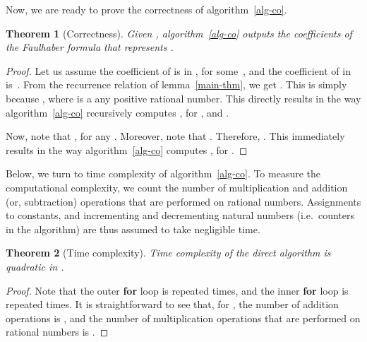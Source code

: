 \documentclass[a4paper,10pt]{amsart}
\newtheorem{theorem}{Theorem}
\theoremstyle{remark}
\begin{document}
Now, we are ready to prove the correctness of algorithm~\ref{alg-co}.
\begin{theorem}[Correctness]
Given , algorithm~\ref{alg-co} outputs the
coefficients of the Faulhaber formula that represents .
\end{theorem}
\begin{proof}
Let us assume the coefficient of  is  in , for
some~, and the coefficient of  in 
is~. From the recurrence relation of lemma~\ref{main-thm}, we
get . This is simply because , where  is a any positive rational
number. This directly results in the way  algorithm~\ref{alg-co}
recursively computes , for , and .

Now, note that , for any . Moreover, note that
. Therefore,
. This immediately results in the way
algorithm~\ref{alg-co} computes , for .
\end{proof}

Below, we turn to time complexity of algorithm~\ref{alg-co}.  To
measure the computational complexity, we count the number of
multiplication and addition (or, subtraction) operations that are
performed on rational numbers.  Assignments to constants, and
incrementing and decrementing natural numbers (i.e.\ counters in the
algorithm) are thus assumed to take negligible time.

\begin{theorem}[Time complexity]
Time complexity of the direct algorithm is quadratic in .
\end{theorem}
\begin{proof}
Note that the outer \textbf{for} loop is repeated  times, and the
inner \textbf{for} loop is repeated 
times. It is straightforward to see that, for , the number
of addition operations is , and the number of
multiplication operations that are performed on rational numbers is
.
\end{proof}







\end{document}
